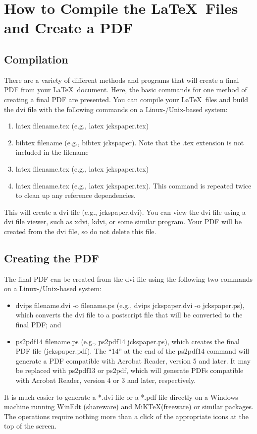 \documentclass[12pt]{article}
\begin{document}
\section{How to Compile the \LaTeX\ Files and Create a PDF}
\subsection{Compilation}
There are a variety of different methods and programs that will create a final PDF from your \LaTeX\ document.  Here, the basic commands for one method of creating a final PDF are presented. You can compile your \LaTeX\ files and build the dvi file with the following commands on a Linux-/Unix-based system:

%
\begin{enumerate}
\item latex filename.tex (e.g., latex jckspaper.tex)
\item bibtex filename (e.g., bibtex jckspaper).  Note that the .tex extension is not included in the filename
\item latex filename.tex (e.g., latex jckspaper.tex)
\item latex filename.tex (e.g., latex jckspaper.tex).  This command is repeated twice to clean up any reference dependencies.
\end{enumerate}
This will create a dvi file (e.g., jckspaper.dvi).  You can view the dvi file using a dvi file viewer, such as xdvi, kdvi, or some similar program.  Your PDF will be created from the dvi file, so do not delete this file.

\subsection{Creating the PDF}
The final PDF can be created from the dvi file using the following two commands on a Linux-/Unix-based system:
\begin{itemize} %
\item[]{dvips filename.dvi -o filename.ps (e.g., dvips jckspaper.dvi -o   jckspaper.ps), which converts the dvi file to a postscript file that will be converted to the final PDF; and}
\item[]{ps2pdf14 filename.ps (e.g., ps2pdf14 jckspaper.ps), which creates the final PDF file (jckspaper.pdf).  The ``14'' at the end of the ps2pdf14 command will   generate a PDF compatible with Acrobat Reader, version 5 and later. It may be replaced with ps2pdf13 or ps2pdf, which will generate PDFs compatible with Acrobat Reader, version 4 or 3 and later,
  respectively.}
\end{itemize}
It is much easier to generate a *.dvi file or a *.pdf file directly on a Windows machine running WinEdt (shareware) and MiK\TeX (freeware) or similar packages.  The operations require nothing more than a click of the appropriate icons at the top of the screen.
\end{document}
